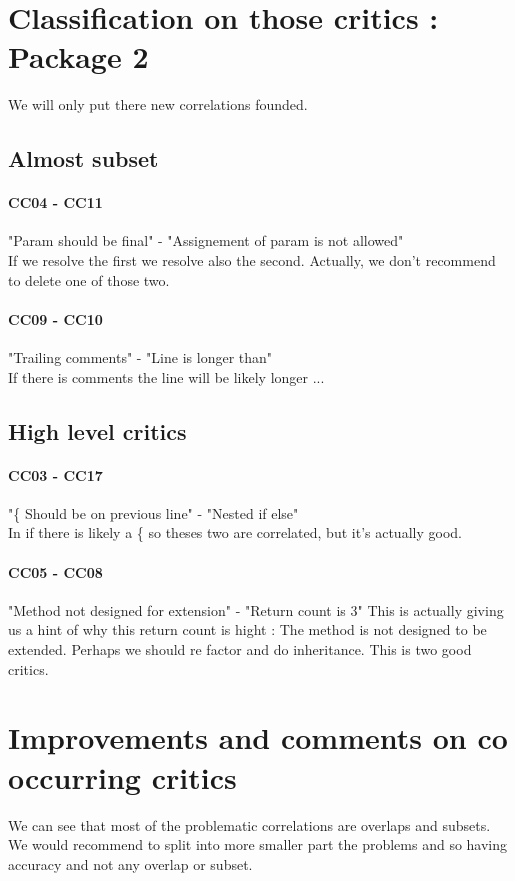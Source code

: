 \documentclass{article}
\begin{document}
\section{Classification on those critics : Package 2}
We will only put there new correlations founded.

\subsection{Almost subset}
\paragraph{CC04 - CC11}
 "Param should be final" - "Assignement of param is not allowed"  \\
If we resolve the first we resolve also the second. Actually, we don't recommend to delete one of those two.

\paragraph{CC09 - CC10}
 "Trailing comments" - "Line is longer than" \\
If there is comments the line will be likely longer ...

\subsection{High level critics}
\paragraph{CC03 - CC17} 
"\{ Should be on previous line" -  "Nested if else" \\
In if there is likely a \{ so theses two are correlated, but it's actually good.

\paragraph{CC05 - CC08} 
 "Method not designed for extension" - "Return count is 3"
This is actually giving us a hint of why this return count is hight : The method is not designed to be extended. Perhaps we should re factor and do inheritance. This is two good critics.


\section{Improvements and comments on co occurring critics} 
We can see that most of the problematic correlations are overlaps and subsets. \\We would recommend to split into more smaller part the problems and so having accuracy and not any overlap or subset. \\
\end{document}
